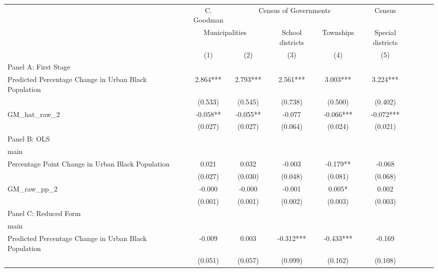  \begin{tabular}{l*{8}{c}} \toprule
&\multicolumn{1}{c}{C. Goodman}&\multicolumn{3}{c}{Census of Governments}&\multicolumn{1}{c}{Census}\\\cmidrule(lr){2-2}\cmidrule(lr){3-5}\cmidrule(lr){6-6}
&\multicolumn{2}{c}{Municipalities}&\multicolumn{1}{c}{School districts}&\multicolumn{1}{c}{Townships}&\multicolumn{1}{c}{Special districts}&\\\cmidrule(lr){2-3}\cmidrule(lr){4-5}\cmidrule(lr){6-6}
&\multicolumn{1}{c}{(1)}&\multicolumn{1}{c}{(2)}&\multicolumn{1}{c}{(3)}&\multicolumn{1}{c}{(4)}&\multicolumn{1}{c}{(5)}\\
\cmidrule(lr){1-6}
\multicolumn{5}{l}{Panel A: First Stage}\\
\cmidrule(lr){1-6}
Predicted Percentage Change in Urban Black Population&    2.864***&    2.793***&    2.561***&    3.003***&    3.224***\\
                &  (0.533)   &  (0.545)   &  (0.738)   &  (0.500)   &  (0.402)   \\
\addlinespace
GM\_hat\_raw\_2    &   -0.058** &   -0.055** &   -0.077   &   -0.066***&   -0.072***\\
                &  (0.027)   &  (0.027)   &  (0.064)   &  (0.024)   &  (0.021)   \\
\cmidrule(lr){1-6}
\multicolumn{5}{l}{Panel B: OLS}\\
\cmidrule(lr){1-6}
main            &            &            &            &            &            \\
Percentage Point Change in Urban Black Population&    0.021   &    0.032   &   -0.003   &   -0.179** &   -0.068   \\
                &  (0.027)   &  (0.030)   &  (0.048)   &  (0.081)   &  (0.068)   \\
\addlinespace
GM\_raw\_pp\_2     &   -0.000   &   -0.000   &   -0.001   &    0.005*  &    0.002   \\
                &  (0.001)   &  (0.001)   &  (0.002)   &  (0.003)   &  (0.003)   \\
\cmidrule(lr){1-6}
\multicolumn{5}{l}{Panel C: Reduced Form}\\
\cmidrule(lr){1-6}
main            &            &            &            &            &            \\
Predicted Percentage Change in Urban Black Population&   -0.009   &    0.003   &   -0.312***&   -0.433***&   -0.169   \\
                &  (0.051)   &  (0.057)   &  (0.099)   &  (0.162)   &  (0.108)   \\

\end{tabular}
